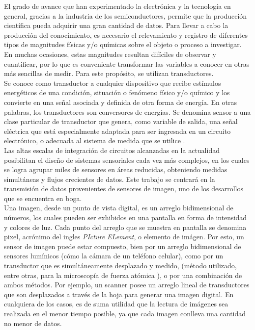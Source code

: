 El grado de avance que han experimentado la electrónica y la tecnología en general, gracias a la industria de los semiconductores, permite que la producción científica pueda adquirir una gran cantidad de datos. Para llevar a cabo la producción del conocimiento, es necesario el relevamiento y registro de diferentes tipos de magnitudes físicas y/o químicas sobre el objeto o proceso a investigar. En muchas ocasiones, estas magnitudes resultan difíciles de observar y cuantificar, por lo que es conveniente transformar las variables a conocer en otras más sencillas de medir. Para este propósito, se utilizan transductores.\\

Se conoce como transductor a cualquier dispositivo que recibe estímulos energéticos de una condición, situación o fenómeno físico y/o químico y los convierte en una señal asociada y definida de otra forma de energía\cite{Pallas-Areny2001}\cite{considine1971encyclopedia}. En otras palabras, los transductores son conversores de energías\cite{considine1971encyclopedia}\cite{Pallas-Areny2001}\cite{PerezGarcia2008}. Se denomina sensor a una clase particular de transductor que genera, como variable de salida, una señal eléctrica que está especialmente adaptada para ser ingresada en un circuito electrónico, o adecuada al sistema de medida que se utilice \cite{Fraden2010}\cite{Slawinski2011}\cite{Ogata2002}.\\

Las altas escalas de integración de circuitos alcanzadas en la actualidad posibilitan el diseño de sistemas sensoriales cada vez más complejos, en los cuales se logra agrupar miles de sensores en áreas reducidas, obteniendo medidas simultáneas y flujos crecientes de datos. Este trabajo se centrará en la transmisión de datos provenientes de sensores de imagen, uno de los desarrollos que se encuentra en boga.\\

Una imagen, desde un punto de vista digital, es un arreglo bidimensional de números, los cuales pueden ser exhibidos en una pantalla en forma de intensidad y colores de luz. Cada punto del arreglo que se muestra en pantalla se denomina pixel, acrónimo del ingles {\it PIcture ELement}, o elemento de imágen. Por esto, un sensor de imagen puede estar compuesto, bien por un arreglo bidimensional de sensores lumínicos (cómo la cámara de un teléfono celular), como por un transductor que es simultáneamente desplazado y medido, (método utilizado, entre otras, para la microscopía de fuerza atómica \cite{Binnig1983}), o por una combinación de ambos métodos. Por ejemplo, un scanner posee un arreglo lineal de transductores que son desplazados a través de la hoja para generar una imagen digital. En cualquiera de los casos, es de suma utilidad que la lectura de imágenes sea realizada en el menor tiempo posible, ya que cada imagen conlleva una cantidad no menor de datos.\\

